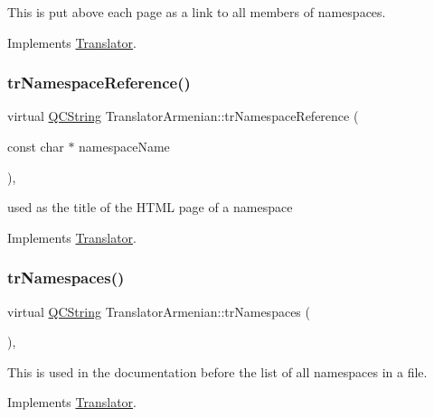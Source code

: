 This is put above each page as a link to all members of namespaces. 

Implements \mbox{\hyperlink{class_translator}{Translator}}.

\mbox{\label{class_translator_armenian_aeb7178dcb0450a6bf2006c9ff6811754}} 
\subsubsection{\texorpdfstring{trNamespaceReference()}{trNamespaceReference()}}
{\footnotesize\ttfamily virtual \mbox{\hyperlink{class_q_c_string}{Q\+C\+String}} Translator\+Armenian\+::tr\+Namespace\+Reference (\begin{DoxyParamCaption}\item[{const char $\ast$}]{namespace\+Name }\end{DoxyParamCaption})\hspace{0.3cm}{\ttfamily [inline]}, {\ttfamily [virtual]}}

used as the title of the H\+T\+ML page of a namespace 

Implements \mbox{\hyperlink{class_translator}{Translator}}.

\mbox{\label{class_translator_armenian_a5e498ca1cb0e1c836e27cb5a22595a89}} 
\subsubsection{\texorpdfstring{trNamespaces()}{trNamespaces()}}
{\footnotesize\ttfamily virtual \mbox{\hyperlink{class_q_c_string}{Q\+C\+String}} Translator\+Armenian\+::tr\+Namespaces (\begin{DoxyParamCaption}{ }\end{DoxyParamCaption})\hspace{0.3cm}{\ttfamily [inline]}, {\ttfamily [virtual]}}

This is used in the documentation before the list of all namespaces in a file. 

Implements \mbox{\hyperlink{class_translator}{Translator}}.

